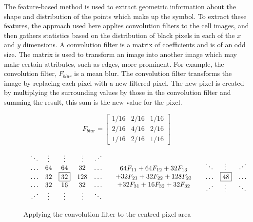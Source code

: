 
The feature-based method is used to extract geometric information about the
shape and distribution of the points which make up the symbol. To extract these
features, the approach used here applies convolution filters to the cell images,
and then gathers statistics based on the distribution of black pixels in each
of the $x$ and $y$ dimensions. A convolution filter is a matrix of coefficients
and is of an odd size. The matrix is used to transform an image into another
image which may make certain attributes, such as edges, more prominent.  For
example, the convolution filter, $F_{blur}$ is a mean blur. The convolution
filter transforms the image by replacing each pixel with a new filtered pixel.
The new pixel is created by multiplying the surrounding values by those in the
convolution filter and summing the result, this sum is the new value for the
pixel.

\[ F_{blur} = \left[
\begin{array}{ccc}
1/16 & 2/16 & 1/16 \\
2/16 & 4/16 & 2/16 \\
1/16 & 2/16 & 1/16
\end{array}\right] \]

\begin{figure}[h] \[
\begin{array}{lcr}
\begin{array}{ccccc}
\ddots & \vdots & \vdots & \vdots & \iddots \\
\ldots & 64 & 64 & 32 & \ldots \\
\ldots & 32 & \fbox{32} & 128 & \ldots \\
\ldots & 32 & 16 & 32 & \ldots \\
\iddots & \vdots & \vdots & \vdots & \ddots \\
\end{array} &
\begin{array}{c}
64F_{11} + 64F_{12} + 32F_{13} \\
+ 32F_{21} + 32F_{22} + 128F_{23} \\
+ 32F_{31} + 16F_{32} + 32F_{32} \\
\end{array} &
\begin{array}{ccccc}
\ddots & \vdots & \iddots \\
\ldots &  \fbox{48}  & \ldots \\
\iddots & \vdots & \ddots \\
\end{array}
\end{array} \]
\caption{Applying the convolution filter to the centred pixel area}
\label{figure:convolution}
\end{figure}

